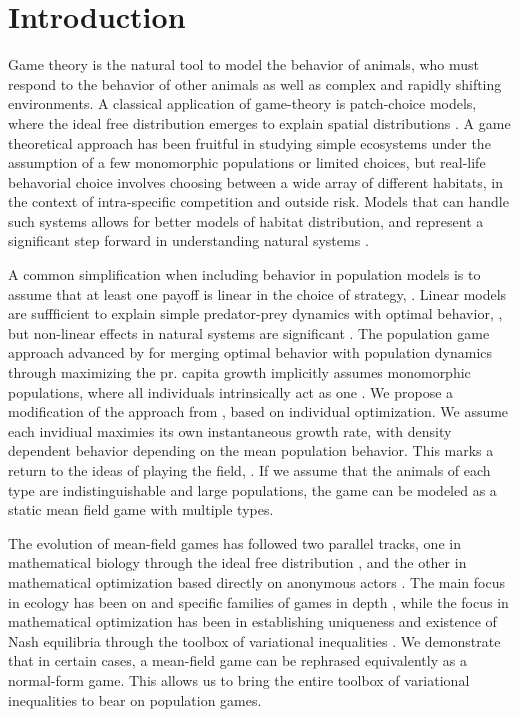 \section*{Introduction}

Game theory is the natural tool to model the behavior of animals, who must respond to the behavior of other animals as well as complex and rapidly shifting environments. A classical application of game-theory is patch-choice models, where the ideal free distribution emerges to explain spatial distributions  \citep{cressman2004ideal, fretwell1969territorial}. A game theoretical approach has been fruitful in studying simple ecosystems under the assumption of a few monomorphic populations or limited choices, but real-life behavorial choice involves choosing between a wide array of different habitats, in the context of intra-specific competition and outside risk. Models that can handle such systems allows for better models of habitat distribution, and represent a significant step forward in understanding natural systems \citep{morris2003shadows}.

A common simplification when including behavior in population models is to assume that at least one payoff is linear in the choice of strategy, \citep{krivan1997dynamic}. Linear models are suffficient to explain simple predator-prey dynamics with optimal behavior, \citep{kvrivan2007lotka}, but non-linear effects in natural systems are significant \citep{gross2009generalized}. The population game approach advanced by \citep{vincent2005evolutionary} for merging optimal behavior with population dynamics through maximizing the pr. capita growth implicitly assumes monomorphic populations, where all individuals intrinsically act as one \citep{malone2020ecology,stump2017optimally}. We propose a modification of the approach from \citep{vincent2005evolutionary}, based on individual optimization. We assume each invidiual maximies its own instantaneous growth rate, with density dependent behavior depending on the mean population behavior. This marks a return to the ideas of playing the field, \citep{smith1982evolution, cressman2010ideal}. If we assume that the animals of each type are indistinguishable and large populations, the game can be modeled as a static mean field game with multiple types.


The evolution of mean-field games has followed two parallel tracks, one in mathematical biology through the ideal free distribution \citep{fretwell1969territorial, cressman2004ideal, kvrivan2008ideal, cressman2010ideal}, and the other in mathematical optimization based directly on anonymous actors \citep{lasry2007mean, aumann1964markets, blanchet2016optimal}. The main focus in ecology has been on and specific families of games in depth \cite{broom2013game}, while the focus in mathematical optimization has been in establishing uniqueness and existence of Nash equilibria through the toolbox of variational inequalities \citep{karamardian1969nonlinear, gabay1980uniqueness, nabetani2011parametrized}. We demonstrate that in certain cases, a mean-field game can be rephrased equivalently as a normal-form game. This allows us to bring the entire toolbox of variational inequalities to bear on population games.


